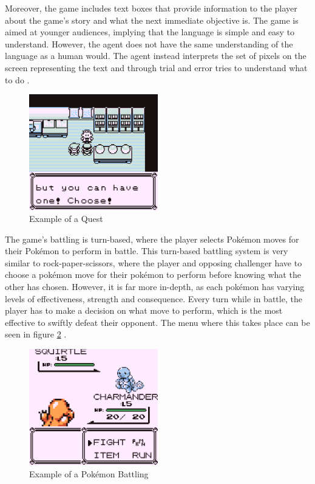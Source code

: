 Moreover, the game includes text boxes that provide information to the player about the game's story and what the next immediate objective is. The game is aimed at younger audiences, implying that the language is simple and easy to understand. However, the agent does not have the same understanding of the language as a human would. The agent instead interprets the set of pixels on the screen representing the text and through trial and error tries to understand what to do \cite{HubZ_1998}. 

\begin{figure}[H]
    \centering
    \includegraphics[width=0.5\textwidth]{figures/red_quest_example.png}
    \caption{Example of a Quest}
    \label{fig:pkmn_quest}
\end{figure}

The game's battling is turn-based, where the player selects Pokémon moves for their Pokémon to perform in battle. This turn-based battling system is very similar to rock-paper-scissors, where the player and opposing challenger have to choose a pokémon move for their pokémon to perform before knowing what the other has chosen. However, it is far more in-depth, as each pokémon has varying levels of effectiveness, strength and consequence. Every turn while in battle, the player has to make a decision on what move to perform, which is the most effective to swiftly defeat their opponent. The menu where this takes place can be seen in figure \ref{fig:pkmn_battling} \cite{HubZ_1998}.

\begin{figure}[H]
    \centering
    \includegraphics[width=0.5\textwidth]{figures/red_battling.png}
    \caption{Example of a Pokémon Battling}
    \label{fig:pkmn_battling}
\end{figure}

